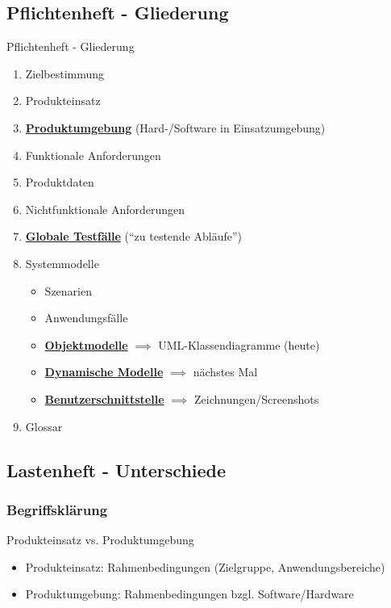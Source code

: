 \documentclass[18pt]{beamer}
\begin{document}
	\subsection{Pflichtenheft - Gliederung}
	\begin{frame}{Pflichtenheft - Gliederung}
		\begin{enumerate}
			\item Zielbestimmung  
			\item Produkteinsatz 
			\item \underline{\textbf{Produktumgebung}} (Hard-/Software in Einsatzumgebung)
			\item Funktionale Anforderungen 
			\item Produktdaten 
			\item Nichtfunktionale Anforderungen 
			\item \underline{\textbf{Globale Testfälle}} (\enquote{zu testende Abläufe})
			\item Systemmodelle
			\begin{itemize}
				\item Szenarien
				\item Anwendungsfälle
				\item \underline{\textbf{Objektmodelle}} $\implies$ UML-Klassendiagramme (heute)
				\item \underline{\textbf{Dynamische Modelle}} $\implies$ nächstes Mal
				\item \underline{\textbf{Benutzerschnittstelle}} $\implies$ Zeichnungen/Screenshots
			\end{itemize}
			\item Glossar 
		\end{enumerate}
	\end{frame}
	
	\subsection{Lastenheft - Unterschiede}
	\begin{frame}
		\frametitle{Begriffsklärung}
		\begin{block}{Produkteinsatz vs. Produktumgebung}
			\pause
			\begin{itemize}
				\item Produkteinsatz: Rahmenbedingungen (Zielgruppe, Anwendungsbereiche)
				\item Produktumgebung: Rahmenbedingungen bzgl. Software/Hardware
			\end{itemize}
		\end{block}
	\end{frame}
	
\end{document}
